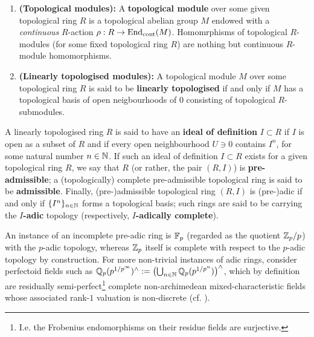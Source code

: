             \begin{definition} \label{def: topological_modules}
                \noindent
                \begin{enumerate}
                    \item \textbf{(Topological modules):} A \textbf{topological module} over some given topological ring $R$ is a topological abelian group $M$ endowed with a \textit{continuous} $R$-action $\rho: R \to \mathrm{End}_{\mathrm{cont}}(M)$. Homomrphisms of topological $R$-modules (for some fixed topological ring $R$) are nothing but continuous $R$-module homomorphisms.
                    \item \textbf{(Linearly topologised modules):} A topological module $M$ over some topological ring $R$ is said to be \textbf{linearly topologised} if and only if $M$ has a topological basis of open neigbourhoods of $0$ consisting of topological $R$-submodules.
                \end{enumerate}
            \end{definition}
            \begin{definition} \label{def: pre_admissible_and_pre_adic_rings}
                A linearly topologised ring $R$ is said to have an \textbf{ideal of definition} $I \subset R$ if $I$ is open as a subset of $R$ and if every open neighbourhood $U \ni 0$ contains $I^n$, for some natural number $n \in \mathbb{N}$. If such an ideal of definition $I \subset R$ exists for a given topological ring $R$, we say that $R$ (or rather, the pair $(R, I)$) is \textbf{pre-admissible}; a (topologically) complete pre-admissible topological ring is said to be \textbf{admissible}. Finally, (pre-)admissible topological ring $(R, I)$ is (pre-)adic if and only if $\{I^n\}_{n \in \mathbb{N}}$ forms a topological basis; such rings are said to be carrying the \textbf{$I$-adic} topology (respectively, \textbf{$I$-adically complete}).
            \end{definition}
            \begin{example}
                An instance of an incomplete pre-adic ring is $\mathbb{F}_p$ (regarded as the quotient $\mathbb{Z}_p/p$) with the $p$-adic topology, whereas $\mathbb{Z}_p$ itself is complete with respect to the $p$-adic topology by construction. For more non-trivial instances of adic rings, consider perfectoid fields such as $\mathbb{Q}_p( p^{ 1/p^{\infty} } )^{\wedge} := \left( \bigcup_{n \in \mathbb{N}} \mathbb{Q}_p( p^{ 1/p^n } ) \right)^{\wedge}$, which by definition are residually semi-perfect\footnote{I.e. the Frobenius endomorphisms on their residue fields are surjective.} complete non-archimedean mixed-characteristic fields whose associated rank-$1$ valuation is non-discrete (cf. \cite{scholze2011perfectoid}).
            \end{example}
